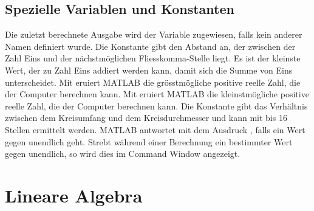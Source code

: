\subsection{Spezielle Variablen und Konstanten}
Die zuletzt berechnete Ausgabe wird der Variable  zugewiesen, falls kein anderer Namen definiert wurde. Die Konstante  gibt den Abstand an, der zwischen der Zahl Eins und der nächstmöglichen Fliesskomma-Stelle liegt. Es ist der kleinste Wert, der zu Zahl Eins addiert werden kann, damit sich die Summe von Eins unterscheidet. Mit  eruiert MATLAB die grösstmögliche positive reelle Zahl, die der Computer berechnen kann. Mit  eruiert MATLAB die kleinstmögliche positive reelle Zahl, die der Computer berechnen kann. Die Konstante  gibt das Verhältnis zwischen dem Kreisumfang und dem Kreisdurchmesser und kann mit bis 16 Stellen ermittelt werden. MATLAB antwortet mit dem Ausdruck , falls ein Wert gegen unendlich geht. Strebt während einer Berechnung ein bestimmter Wert gegen unendlich, so wird dies im Command Window angezeigt.
\section{Lineare Algebra} 

